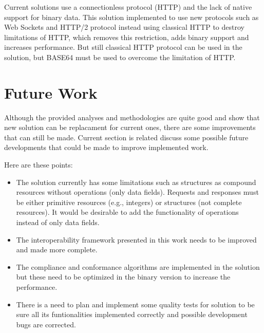 Current solutions use a connectionless protocol (HTTP) and the lack of native support for binary data. This solution implemented to use new protocols such as Web Sockets and HTTP/2 protocol instead using classical HTTP to destroy limitations of HTTP, which removes this restriction, adds binary support and increases performance. But still classical HTTP protocol can be used in the solution, but BASE64 must be used to overcome the limitation of HTTP.


\section{Future Work}
\label{section:future}

Although the provided analyses and methodologies are quite good and show that new solution can be replacament for current ones, there are some improvements that can still be made. Current section is related discuss some possible future developments that could be made to improve implemented work.

Here are these points:

\begin{itemize}

\item The solution currently has some limitations such as structures as compound resources without operations (only data fields). Requests and responses must be either primitive resources (e.g., integers) or structures (not complete resources). It would be desirable to add the functionality of operations instead of only data fields.

\item The interoperability framework presented in this work needs to be improved and made more complete.

\item The compliance and conformance algorithms are implemented in the solution but these need to be optimized in the binary version to increase the performance.

\item There is a need to plan and implement some quality tests for solution to be sure all its funtionalities implemented correctly and possible development bugs are corrected.

\end{itemize}
